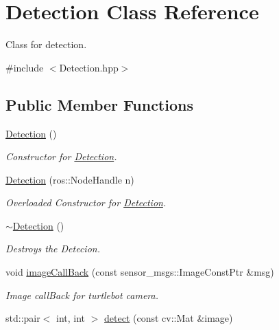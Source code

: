 \hypertarget{class_detection}{}\section{Detection Class Reference}
\label{class_detection}


Class for detection.  




{\ttfamily \#include $<$Detection.\+hpp$>$}

\subsection*{Public Member Functions}
\begin{DoxyCompactItemize}
\item 
\mbox{\label{class_detection_a86e6ebf5a660a29e78ee7a7f08292260}} 
\hyperlink{class_detection_a86e6ebf5a660a29e78ee7a7f08292260}{Detection} ()
\begin{DoxyCompactList}\small\item\em Constructor for \hyperlink{class_detection}{Detection}. \end{DoxyCompactList}\item 
\hyperlink{class_detection_a98a60038a268baf116cd3faeda086244}{Detection} (ros\+::\+Node\+Handle n)
\begin{DoxyCompactList}\small\item\em Overloaded Constructor for \hyperlink{class_detection}{Detection}. \end{DoxyCompactList}\item 
\mbox{\label{class_detection_abbfdeb60a10132d820fcd20dd292e400}} 
\hyperlink{class_detection_abbfdeb60a10132d820fcd20dd292e400}{$\sim$\+Detection} ()
\begin{DoxyCompactList}\small\item\em Destroys the Detecion. \end{DoxyCompactList}\item 
void \hyperlink{class_detection_a1d21be46013c15983191c1bb0835e205}{image\+Call\+Back} (const sensor\+\_\+msgs\+::\+Image\+Const\+Ptr \&msg)
\begin{DoxyCompactList}\small\item\em Image call\+Back for turtlebot camera. \end{DoxyCompactList}\item 
std\+::pair$<$ int, int $>$ \hyperlink{class_detection_a8a2edcc8953e1497993d06ab51d36e64}{detect} (const cv\+::\+Mat \&image)

\end{DoxyCompactItemize}
